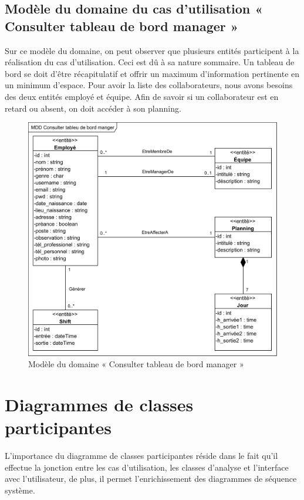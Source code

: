 \begin{itemize}
        \subsection*{Modèle du domaine du cas d'utilisation « Consulter tableau de bord manager »}
        Sur ce modèle du domaine, on peut observer que plusieurs entités participent à la réalisation du cas d’utilisation. Ceci est dû à sa nature sommaire.
        Un tableau de bord se doit d’être récapitulatif et offrir un maximum d’information pertinente en un minimum d’espace. Pour avoir la liste des collaborateurs, nous avons besoins des deux entités employé et équipe. Afin de savoir si un collaborateur est en retard ou absent, on doit accéder à son planning. 
        
            \begin{figure}[h!]
                 \centering
                \includegraphics[scale=1.06]{images/MDD/MDD Consulter tableu de bord manger.png}
                 \caption{Modèle du domaine « Consulter tableau de bord manager »}
                 \label{fig19}
            \end{figure}
            
\section{Diagrammes de classes participantes}
    L’importance du diagramme de classes participantes réside dans le fait qu’il effectue la jonction entre les cas d’utilisation, les classes d’analyse et l’interface avec l’utilisateur, de plus, il permet l’enrichissement des diagrammes de séquence système.\cite{8}

\end{itemize}
